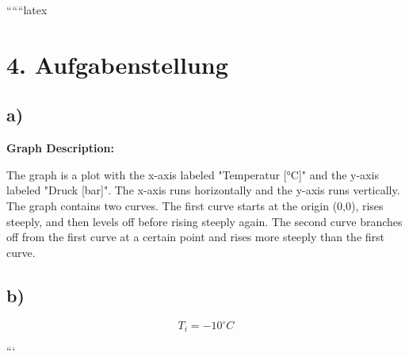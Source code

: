 
``````latex


\section*{4. Aufgabenstellung}

\subsection*{a)}

\textbf{Graph Description:}

The graph is a plot with the x-axis labeled "Temperatur [°C]" and the y-axis labeled "Druck [bar]". The x-axis runs horizontally and the y-axis runs vertically. The graph contains two curves. The first curve starts at the origin (0,0), rises steeply, and then levels off before rising steeply again. The second curve branches off from the first curve at a certain point and rises more steeply than the first curve.

\subsection*{b)}

\[
T_i = -10^\circ C
\]

```